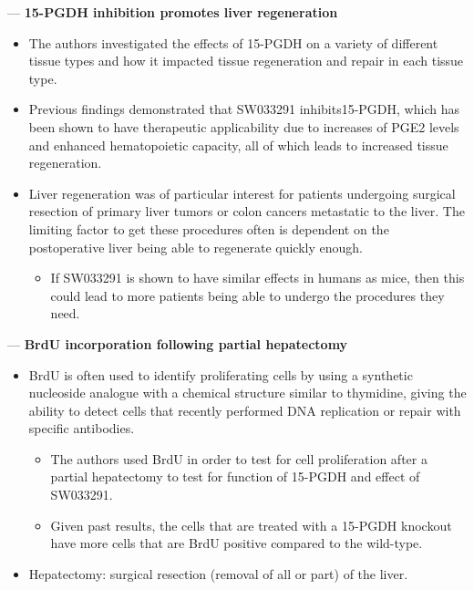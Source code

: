 \documentclass[basic,plain]{inVerba-notes}
\begin{document}
 --- \textbf{15-PGDH inhibition promotes liver regeneration}
\begin{itemize}
  \item The authors investigated the effects of 15-PGDH on a variety of different tissue types and how it impacted tissue regeneration and repair in each tissue type.
  \item Previous findings demonstrated that SW033291 inhibits15-PGDH, which has been shown to have therapeutic applicability due to increases of PGE2 levels and enhanced hematopoietic capacity, all of which leads to increased tissue regeneration.
  \item Liver regeneration was of particular interest for patients undergoing surgical resection of primary liver tumors or colon cancers metastatic to the liver. The limiting factor to get these procedures often is dependent on the postoperative liver being able to regenerate quickly enough.
    \begin{itemize}
      \item If SW033291 is shown to have similar effects in humans as mice, then this could lead to more patients being able to undergo the procedures they need.
    \end{itemize}
\end{itemize}

 --- \textbf{BrdU incorporation following partial hepatectomy}
\begin{itemize}
  \item BrdU is often used to identify proliferating cells by using a synthetic nucleoside analogue with a chemical structure similar to thymidine, giving the ability to detect cells that recently performed DNA replication or repair with specific antibodies.
    \begin{itemize}
      \item The authors used BrdU in order to test for cell proliferation after a partial hepatectomy to test for function of 15-PGDH and effect of SW033291.
      \item Given past results, the cells that are treated with a 15-PGDH knockout have more cells that are BrdU positive compared to the wild-type.
    \end{itemize}
  \item Hepatectomy: surgical resection (removal of all or part) of the liver.
\end{itemize}
\medskip


\begin{center}
\end{center}
\end{document}

